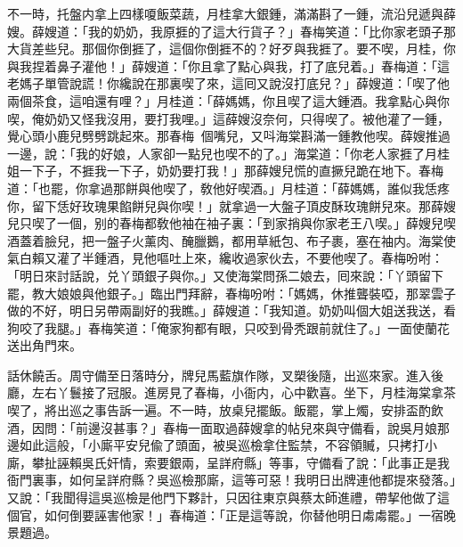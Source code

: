 不一時，托盤内拿上四樣嗄飯菜蔬，月桂拿大銀鍾，滿滿斟了一鍾，流沿兒遞與薛嫂。薛嫂道：「我的奶奶，我原捱的了這大行貨子？」春梅笑道：「比你家老頭子那大貨差些兒。那個你倒捱了，這個你倒捱不的？好歹與我捱了。要不喫，月桂，你與我捏着鼻子灌他！」薛嫂道：「你且拿了點心與我，打了底兒着。」春梅道：「這老媽子單管說謊！你纔說在那裏喫了來，這囘又說沒打底兒？」薛嫂道：「喫了他兩個茶食，這咱還有哩？」月桂道：「薛媽媽，你且喫了這大鍾酒。我拿點心與你喫，俺奶奶又怪我沒用，要打我哩。」這薛嫂沒奈何，只得喫了。被他灌了一鍾，覺心頭小鹿兒劈劈跳起來。那春梅𢫓𢫓個嘴兒，又呌海棠斟滿一鍾教他喫。薛嫂推過一邊，說：「我的好娘，人家卻一點兒也喫不的了。」海棠道：「你老人家捱了月桂姐一下子，不捱我一下子，奶奶要打我！」那薛嫂兒慌的直撅兒跪在地下。春梅道：「也罷，你拿過那餅與他喫了，敎他好喫酒。」月桂道：「薛媽媽，誰似我恁疼你，留下恁好玫瑰果餡餅兒與你喫！」就拿過一大盤子頂皮酥玫瑰餅兒來。那薛嫂兒只喫了一個，别的春梅都敎他袖在袖子裏：「到家捎與你家老王八喫。」薛嫂兒喫酒蓋着臉兒，把一盤子火薰肉、醃臘鵝，都用草紙包、布子裹，塞在袖内。海棠使氣白賴又灌了半鍾酒，見他嘔吐上來，纔收過家伙去，不要他喫了。春梅吩咐：「明日來討話說，兑丫頭銀子與你。」又使海棠問孫二娘去，囘來說：「丫頭留下罷，教大娘娘與他銀子。」臨出門拜辭，春梅吩咐：「媽媽，休推聾裝啞，那翠雲子做的不好，明日另帶兩副好的我瞧。」薛嫂道：「我知道。奶奶叫個大姐送我送，看狗咬了我腿。」春梅笑道：「俺家狗都有眼，只咬到骨秃跟前就住了。」一面使蘭花送出角門來。

話休饒舌。周守備至日落時分，牌兒馬藍旗作隊，叉槊後隨，出巡來家。進入後廳，左右丫鬟接了冠服。進房見了春梅，小衙内，心中歡喜。坐下，月桂海棠拿茶喫了，將出巡之事告訴一遍。不一時，放桌兒擺飯。飯罷，掌上燭，安排盃酌飲酒，因問：「前邊沒甚事？」春梅一面取過薛嫂拿的帖兒來與守備看，說吳月娘那邊如此這般，「小廝平安兒偸了頭面，被吳巡檢拿住監禁，不容領贓，只拷打小廝，攀扯誣賴吳氏奸情，索要銀兩，呈詳府縣」等事，守備看了說：「此事正是我衙門裏事，如何呈詳府縣？吳巡檢那廝，這等可惡！我明日出牌連他都提來發落。」又說：「我聞得這吳巡檢是他門下夥計，只因往東京與蔡太師進禮，帶挈他做了這個官，如何倒要誣害他家！」春梅道：「正是這等說，你替他明日䖏䖏罷。」一宿晚景題過。

